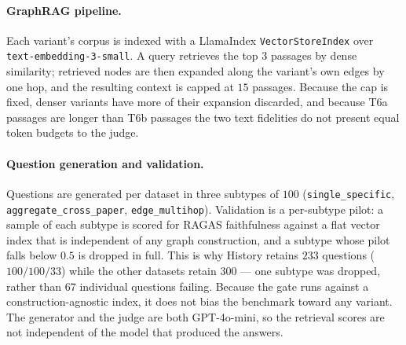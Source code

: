 \paragraph{GraphRAG pipeline.}
Each variant's corpus is indexed with a LlamaIndex \texttt{VectorStoreIndex}
over \texttt{text-embedding-3-small}. A query retrieves the top $3$ passages by
dense similarity; retrieved nodes are then expanded along the variant's own
edges by one hop, and the resulting context is capped at $15$ passages. Because
the cap is fixed, denser variants have more of their expansion discarded, and
because T6a passages are longer than T6b passages the two text fidelities do
not present equal token budgets to the judge.

\paragraph{Question generation and validation.}
Questions are generated per dataset in three subtypes of $100$
(\texttt{single\_specific}, \texttt{aggregate\_cross\_paper},
\texttt{edge\_multihop}). Validation is a per-subtype pilot: a sample of each
subtype is scored for RAGAS faithfulness against a flat vector index that is
independent of any graph construction, and a subtype whose pilot falls below
$0.5$ is dropped in full. This is why History retains $233$ questions
($100/100/33$) while the other datasets retain $300$ --- one subtype was
dropped, rather than $67$ individual questions failing. Because the gate runs
against a construction-agnostic index, it does not bias the benchmark toward
any variant. The generator and the judge are both GPT-4o-mini, so the retrieval
scores are not independent of the model that produced the answers.

